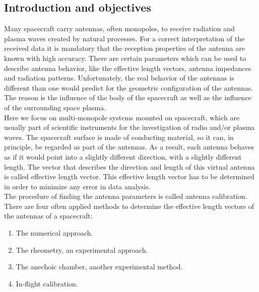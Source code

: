 \documentclass[two-coloumn,ras]{agutex}
\begin{document}
%
%

%


\begin{article}
\section{Introduction and objectives}
Many spacecraft carry antennas, often monopoles, to receive radiation and plasma waves created by natural processes. For a correct interpretation of the received data it is mandatory that the reception properties of the antenna are known with high accuracy. There are certain parameters which can be used to describe antenna behavior, like the effective length vectors, antenna impedances and radiation patterns. Unfortunately, the real behavior of the antennas is different than one would predict for the geometric configuration of the antennas. The reason is the influence of the body of the spacecraft as well as the influence of the surrounding space plasma.\\

Here we focus on multi-monopole systems mounted on spacecraft, which are usually part of scientific instruments for the investigation of radio and/or plasma waves. The spacecraft surface is made of conducting material, so it can, in principle, be regarded as part of the antennas. As a result, each antenna behaves as if it would point into a slightly different direction, with a slightly different length. The vector that describes the direction and length of this virtual antenna is called effective length vector. This effective length vector has to be determined in order to minimize any error in data analysis.\\

The procedure of finding the antenna parameters is called antenna calibration. There are four often applied methods to determine the effective length vectors of the antennas of a spacecraft:

\begin{enumerate}
\item The numerical approach.
\item The rheometry, an experimental approach.
\item The anechoic chamber, another experimental method.
\item In-flight calibration.
\end{enumerate}


\end{article}
\end{document}
